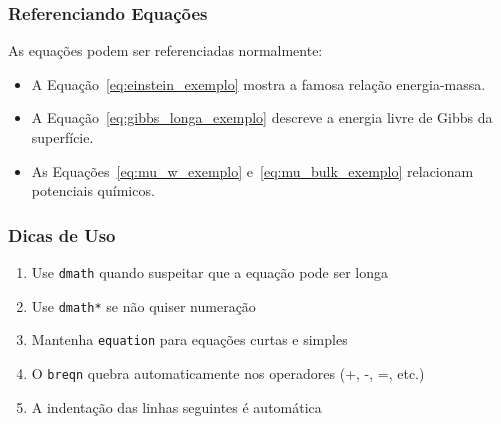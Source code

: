 \subsubsection{Referenciando Equações}

As equações podem ser referenciadas normalmente:
\begin{itemize}
    \item A Equação~\ref{eq:einstein_exemplo} mostra a famosa relação energia-massa.
    \item A Equação~\ref{eq:gibbs_longa_exemplo} descreve a energia livre de Gibbs da superfície.
    \item As Equações~\ref{eq:mu_w_exemplo} e~\ref{eq:mu_bulk_exemplo} relacionam potenciais químicos.
\end{itemize}

\subsubsection{Dicas de Uso}

\begin{enumerate}
    \item Use \texttt{dmath} quando suspeitar que a equação pode ser longa
    \item Use \texttt{dmath*} se não quiser numeração
    \item Mantenha \texttt{equation} para equações curtas e simples
    \item O \texttt{breqn} quebra automaticamente nos operadores (+, -, =, etc.)
    \item A indentação das linhas seguintes é automática
\end{enumerate}

